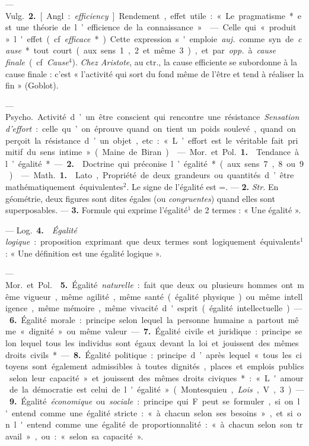 \begin{itemize}[leftmargin=1cm, label=, itemsep=1pt]
— \si{Vulg.} {\bf 2.} [Angl. : {\it efficiency}].
Rendement, effet utile : « Le pragmatisme* est une théorie de
l’efficience de la connaissance. »

 — Celle qui « produit » l'effet (cf.
{\it efficace}*). Cette expression s'emploie  {\it auj.} comme
syn. de {\it cause}* tout court (aux
sens 1, 2 et même 3), et par {\it opp.}
à {\it cause finale} (cf. {\it Cause}$^4$). {\it Chez
Aristote}, au ctr., la cause efficiente
se subordonne à la cause finale :
c’est « l’activité qui sort du fond
même de l’être et tend à réaliser la fin » (Goblot).

 — \si{Psycho.} Activité d’un être
conscient qui rencontre une résistance. {\it Sensation d’effort} :
celle qu’on éprouve quand on tient un poids
soulevé, quand on perçoit la résistance d’un objet, etc. : « L’effort
est le véritable fait primitif du sens
intime » (Maine de Biran).

 — \si{Mor.} et \si{Pol.} {\bf 1.} 
Tendance à l’égalité*. — {\bf 2.}  Doctrine qui
préconise l’égalité* (aux sens 7, 8 ou 9).

 — \si{Math.} {\bf 1.}  Lato, Propriété
de deux grandeurs ou quantités
d’être mathématiquement équivalentes$^2$. Le signe de l'égalité est =.
— {\bf 2.}  {\it Str.} En géométrie, deux
figures sont dites égales (ou {\it congruentes}) quand elles sont
superposables. — {\bf 3.}  Formule qui exprime
l'égalité$^1$ de 2 termes : « Une égalité ».

— \si{Log.} {\bf 4.}  {\it Égalité logique} : proposition
exprimant que deux termes sont logiquement équivalents$^1$ :
« Une définition est une égalité logique ».

— \si{Mor.} et \si{Pol.}  {\bf 5.} Égalité {\it naturelle} : 
fait que deux ou plusieurs hommes ont même vigueur, même
agilité, même santé (égalité physique) ou même intelligence, même
mémoire, même vivacité d'esprit
(égalité intellectuelle). — {\bf 6.} Égalité
morale : principe selon lequel la personne humaine a partout même
« dignité » ou même valeur. — {\bf 7.}
Égalité civile et juridique : principe
selon lequel tous les individus sont
égaux devant la loi et jouissent des
mêmes droits civils*. — {\bf 8.} Égalité
politique : principe d’après lequel
« tous les citoyens sont également
admissibles à toutes dignités, places
et emplois publics selon leur capacité » et jouissent des mêmes droits
civiques* : « L'amour de la démocratie est celui de l'égalité »
(Montesquieu, {\it Lois}, V, 3). — {\bf 9.} Égalité
{\it économique} ou {\it sociale} : principe qui
F peut se formuler, si on l'entend
comme une égalité stricte : « à
chacun selon ses besoins », et si on
l'entend comme une égalité de proportionnalité : « à chacun selon son
travail », ou : « selon sa capacité ».


\end{itemize}
